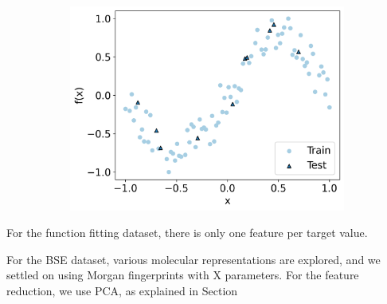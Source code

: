\documentclass[journal=jacsat,manuscript=article]{achemso}
\begin{document}
\begin{figure}[H]
\begin{subfigure}[b]{0.3\textwidth}
		\centering
		\includegraphics[width=\textwidth]{../images/Function_Fitting/function_dataset/sine_train_vs_test.png}
		\caption{}
		\label{fig:sine_train_vs_test}
	\end{subfigure}
	\caption{}
	\label{fig:train_vs_test}
\end{figure}



For the function fitting dataset, there is only one feature per target value.






For the BSE dataset, various molecular representations are explored, and we settled on using Morgan fingerprints with X parameters. 
For the feature reduction, we use PCA, as explained in Section
\end{document}
